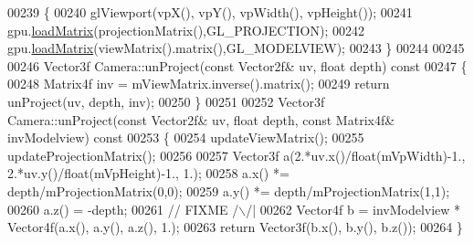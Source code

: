 \begin{DoxyCode}
00239 \{
00240   glViewport(vpX(), vpY(), vpWidth(), vpHeight());
00241   gpu.\hyperlink{class_gpu_helper_a31ac77373dc54409648558d79d5a8c3e}{loadMatrix}(projectionMatrix(),GL\_PROJECTION);
00242   gpu.\hyperlink{class_gpu_helper_a31ac77373dc54409648558d79d5a8c3e}{loadMatrix}(viewMatrix().matrix(),GL\_MODELVIEW);
00243 \}
00244 
00245 
00246 Vector3f Camera::unProject(\textcolor{keyword}{const} Vector2f& uv, \textcolor{keywordtype}{float} depth)\textcolor{keyword}{ const}
00247 \textcolor{keyword}{}\{
00248     Matrix4f inv = mViewMatrix.inverse().matrix();
00249     \textcolor{keywordflow}{return} unProject(uv, depth, inv);
00250 \}
00251 
00252 Vector3f Camera::unProject(\textcolor{keyword}{const} Vector2f& uv, \textcolor{keywordtype}{float} depth, \textcolor{keyword}{const} Matrix4f& invModelview)\textcolor{keyword}{ const}
00253 \textcolor{keyword}{}\{
00254     updateViewMatrix();
00255     updateProjectionMatrix();
00256     
00257     Vector3f a(2.*uv.x()/float(mVpWidth)-1., 2.*uv.y()/float(mVpHeight)-1., 1.);
00258     a.x() *= depth/mProjectionMatrix(0,0);
00259     a.y() *= depth/mProjectionMatrix(1,1);
00260     a.z() = -depth;
00261     \textcolor{comment}{// FIXME /\(\backslash\)/|}
00262     Vector4f b = invModelview * Vector4f(a.x(), a.y(), a.z(), 1.);
00263     \textcolor{keywordflow}{return} Vector3f(b.x(), b.y(), b.z());
00264 \}
\end{DoxyCode}
